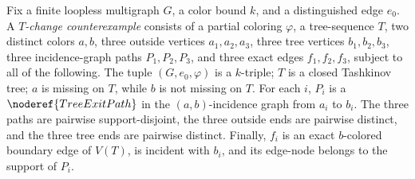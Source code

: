 \begin{definition}
Fix a finite loopless multigraph \(G\), a color bound \(k\), and a
distinguished edge \(e_0\).  A \emph{\(T\)-change counterexample} consists
of a partial coloring \(\varphi\), a tree-sequence \(T\), two distinct
colors \(a,b\), three outside vertices \(a_1,a_2,a_3\), three tree
vertices \(b_1,b_2,b_3\), three incidence-graph paths \(P_1,P_2,P_3\),
and three exact edges \(f_1,f_2,f_3\), subject to all of the following.
The tuple \((G,e_0,\varphi)\) is a \(k\)-triple; \(T\) is a closed
Tashkinov tree; \(a\) is missing on \(T\), while \(b\) is not missing on
\(T\).  For each \(i\), \(P_i\) is a
\(\noderef{TreeExitPath}\) in the \((a,b)\)-incidence graph from \(a_i\)
to \(b_i\).  The three paths are pairwise support-disjoint, the three
outside ends are pairwise distinct, and the three tree ends are pairwise
distinct.  Finally, \(f_i\) is an exact \(b\)-colored boundary edge of
\(V(T)\), is incident with \(b_i\), and its edge-node belongs to the
support of \(P_i\).
\end{definition}
